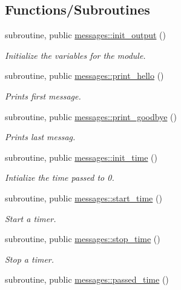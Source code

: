 \subsection*{Functions/\+Subroutines}
\begin{DoxyCompactItemize}
\item 
subroutine, public \hyperlink{namespacemessages_a5e45296f088e9f31115a3b8d869f3177}{messages\+::init\+\_\+output} ()
\begin{DoxyCompactList}\small\item\em Initialize the variables for the module. \end{DoxyCompactList}\item 
subroutine, public \hyperlink{namespacemessages_a60c95b4c352b0087f32ef87279da49ca}{messages\+::print\+\_\+hello} ()
\begin{DoxyCompactList}\small\item\em Prints first message. \end{DoxyCompactList}\item 
subroutine, public \hyperlink{namespacemessages_a5d3f456913230bdf985c363e8cee8489}{messages\+::print\+\_\+goodbye} ()
\begin{DoxyCompactList}\small\item\em Prints last messag. \end{DoxyCompactList}\item 
subroutine, public \hyperlink{namespacemessages_a8ed785522aec7ac549263cdd54a8619a}{messages\+::init\+\_\+time} ()
\begin{DoxyCompactList}\small\item\em Intialize the time passed to 0. \end{DoxyCompactList}\item 
subroutine, public \hyperlink{namespacemessages_a84d5988f3ea5ca8dc2834032f896ae90}{messages\+::start\+\_\+time} ()
\begin{DoxyCompactList}\small\item\em Start a timer. \end{DoxyCompactList}\item 
subroutine, public \hyperlink{namespacemessages_aed343894ae4a28ad6dfbd1d39aac64ff}{messages\+::stop\+\_\+time} ()
\begin{DoxyCompactList}\small\item\em Stop a timer. \end{DoxyCompactList}\item 
subroutine, public \hyperlink{namespacemessages_a34da9df28502ccd63e62674d51fe8de8}{messages\+::passed\+\_\+time} ()

\end{DoxyCompactItemize}
